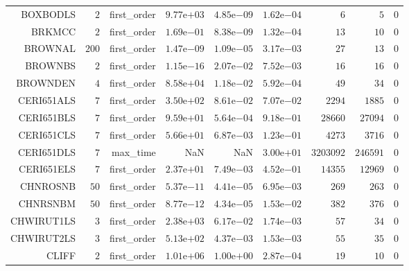 \begin{longtable}{rrrrrrrrr}
BOXBODLS & \(     2\) & first\_order & \( 9.77\)e\(+03\) & \( 4.85\)e\(-09\) & \( 1.62\)e\(-04\) & \(     6\) & \(     5\) & \(     0\) \\
BRKMCC & \(     2\) & first\_order & \( 1.69\)e\(-01\) & \( 8.38\)e\(-09\) & \( 1.32\)e\(-04\) & \(    13\) & \(    10\) & \(     0\) \\
BROWNAL & \(   200\) & first\_order & \( 1.47\)e\(-09\) & \( 1.09\)e\(-05\) & \( 3.17\)e\(-03\) & \(    27\) & \(    13\) & \(     0\) \\
BROWNBS & \(     2\) & first\_order & \( 1.15\)e\(-16\) & \( 2.07\)e\(-02\) & \( 7.52\)e\(-03\) & \(    16\) & \(    16\) & \(     0\) \\
BROWNDEN & \(     4\) & first\_order & \( 8.58\)e\(+04\) & \( 1.18\)e\(-02\) & \( 5.92\)e\(-04\) & \(    49\) & \(    34\) & \(     0\) \\
CERI651ALS & \(     7\) & first\_order & \( 3.50\)e\(+02\) & \( 8.61\)e\(-02\) & \( 7.07\)e\(-02\) & \(  2294\) & \(  1885\) & \(     0\) \\
CERI651BLS & \(     7\) & first\_order & \( 9.59\)e\(+01\) & \( 5.64\)e\(-04\) & \( 9.18\)e\(-01\) & \( 28660\) & \( 27094\) & \(     0\) \\
CERI651CLS & \(     7\) & first\_order & \( 5.66\)e\(+01\) & \( 6.87\)e\(-03\) & \( 1.23\)e\(-01\) & \(  4273\) & \(  3716\) & \(     0\) \\
CERI651DLS & \(     7\) & max\_time &       NaN &       NaN & \( 3.00\)e\(+01\) & \(3203092\) & \(246591\) & \(     0\) \\
CERI651ELS & \(     7\) & first\_order & \( 2.37\)e\(+01\) & \( 7.49\)e\(-03\) & \( 4.52\)e\(-01\) & \( 14355\) & \( 12969\) & \(     0\) \\
CHNROSNB & \(    50\) & first\_order & \( 5.37\)e\(-11\) & \( 4.41\)e\(-05\) & \( 6.95\)e\(-03\) & \(   269\) & \(   263\) & \(     0\) \\
CHNRSNBM & \(    50\) & first\_order & \( 8.77\)e\(-12\) & \( 4.34\)e\(-05\) & \( 1.53\)e\(-02\) & \(   382\) & \(   376\) & \(     0\) \\
CHWIRUT1LS & \(     3\) & first\_order & \( 2.38\)e\(+03\) & \( 6.17\)e\(-02\) & \( 1.74\)e\(-03\) & \(    57\) & \(    34\) & \(     0\) \\
CHWIRUT2LS & \(     3\) & first\_order & \( 5.13\)e\(+02\) & \( 4.37\)e\(-03\) & \( 1.53\)e\(-03\) & \(    55\) & \(    35\) & \(     0\) \\
CLIFF & \(     2\) & first\_order & \( 1.01\)e\(+06\) & \( 1.00\)e\(+00\) & \( 2.87\)e\(-04\) & \(    19\) & \(    10\) & \(     0\) \\

\end{longtable}
